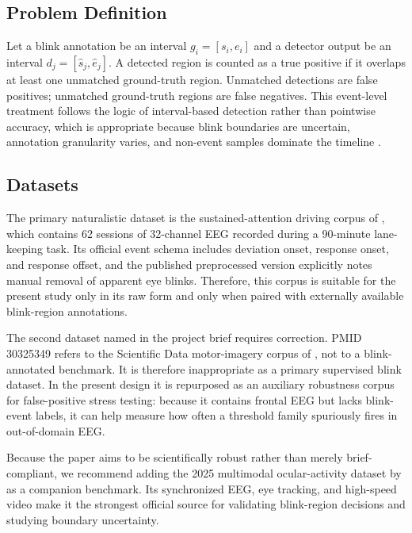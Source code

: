 \subsection{Problem Definition}

Let a blink annotation be an interval \(g_i = [s_i, e_i]\) and a detector output be an interval \(d_j = [\hat{s}_j, \hat{e}_j]\). A detected region is counted as a true positive if it overlaps at least one unmatched ground-truth region. Unmatched detections are false positives; unmatched ground-truth regions are false negatives. This event-level treatment follows the logic of interval-based detection rather than pointwise accuracy, which is appropriate because blink boundaries are uncertain, annotation granularity varies, and non-event samples dominate the timeline \citep{saito2015precision,salles2024softed}.



\subsection{Datasets}

The primary naturalistic dataset is the sustained-attention driving corpus of \citet{cao2019multichannel}, which contains 62 sessions of 32-channel EEG recorded during a 90-minute lane-keeping task. Its official event schema includes deviation onset, response onset, and response offset, and the published preprocessed version explicitly notes manual removal of apparent eye blinks. Therefore, this corpus is suitable for the present study only in its raw form and only when paired with externally available blink-region annotations.

The second dataset named in the project brief requires correction. PMID 30325349 refers to the Scientific Data motor-imagery corpus of \citet{kaya2018large}, not to a blink-annotated benchmark. It is therefore inappropriate as a primary supervised blink dataset. In the present design it is repurposed as an auxiliary robustness corpus for false-positive stress testing: because it contains frontal EEG but lacks blink-event labels, it can help measure how often a threshold family spuriously fires in out-of-domain EEG.

Because the paper aims to be scientifically robust rather than merely brief-compliant, we recommend adding the 2025 multimodal ocular-activity dataset by \citet{guttmann2025dataset} as a companion benchmark. Its synchronized EEG, eye tracking, and high-speed video make it the strongest official source for validating blink-region decisions and studying boundary uncertainty.

